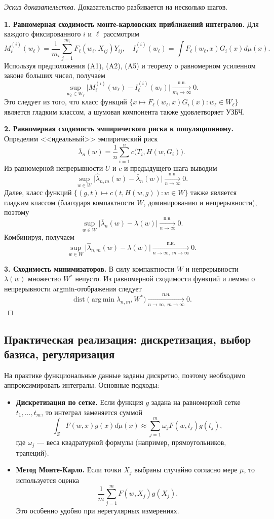 \documentclass[../NDCNNAI_main.tex]{subfiles}
\begin{document}
\begin{proof}[Эскиз доказательства]
Доказательство разбивается на несколько шагов.

\textbf{1. Равномерная сходимость монте-карловских приближений интегралов.}
Для каждого фиксированного $i$ и $\ell$ рассмотрим
\[
M_\ell^{(i)}(w_\ell) = \frac{1}{m_i}\sum_{j=1}^{m_i} F_\ell(w_\ell, X_{ij})Y_{ij}, \quad I_\ell^{(i)}(w_\ell) = \int F_\ell(w_\ell, x)G_i(x)d\mu(x).
\]
Используя предположения (A1), (A2), (A5) и теорему о равномерном усиленном законе больших чисел, получаем
\[
\sup_{w_\ell \in W_\ell} \bigl|M_\ell^{(i)}(w_\ell) - I_\ell^{(i)}(w_\ell)\bigr| \xrightarrow[m_i\to\infty]{\text{п.н.}} 0.
\]
Это следует из того, что класс функций $\{x \mapsto F_\ell(w_\ell, x)G_i(x): w_\ell \in W_\ell\}$ является гладким классом, а шумовая компонента также удовлетворяет УЗБЧ.

\textbf{2. Равномерная сходимость эмпирического риска к популяционному.}
Определим <<идеальный>> эмпирический риск
\[
\bar{\lambda}_n(w) = \frac{1}{n}\sum_{i=1}^n c\bigl(T_i, H(w, G_i)\bigr).
\]
Из равномерной непрерывности $U$ и $c$ и предыдущего шага выводим
\[
\sup_{w\in W} \bigl|\hat{\lambda}_{n,m}(w) - \bar{\lambda}_n(w)\bigr| \xrightarrow[n\to\infty]{\text{п.н.}} 0.
\]
Далее, класс функций $\{(g,t) \mapsto c(t, H(w, g)) : w \in W\}$ также является гладким классом (благодаря компактности $W$, доминированию и непрерывности), поэтому
\[
\sup_{w\in W} \bigl|\bar{\lambda}_n(w) - \lambda(w)\bigr| \xrightarrow[n\to\infty]{\text{п.н.}} 0.
\]
Комбинируя, получаем
\[
\sup_{w\in W} \bigl|\hat{\lambda}_{n,m}(w) - \lambda(w)\bigr| \xrightarrow[n\to\infty,\; m\to\infty]{\text{п.н.}} 0.
\]

\textbf{3. Сходимость минимизаторов.}
В силу компактности $W$ и непрерывности $\lambda(w)$ множество $W^*$ непусто. 
Из равномерной сходимости функций и леммы о непрерывности argmin-отображения следует
\[
\operatorname{dist}\!\bigl(\operatorname{arg\,min} \hat{\lambda}_{n,m}, W^*\bigr) \xrightarrow[n\to\infty,\; m\to\infty]{\text{п.н.}} 0.
\]
\end{proof}

\subsection{Практическая реализация: дискретизация, выбор базиса, регуляризация}
На практике функциональные данные заданы дискретно, поэтому необходимо аппроксимировать интегралы. 
Основные подходы:
\begin{itemize}
    \item \textbf{Дискретизация по сетке.} Если функция $g$ задана на равномерной сетке $t_1,\dots,t_m$, то интеграл заменяется суммой
    \[
    \int_Z F(w, x)g(x)d\mu(x) \approx \sum_{j=1}^m \omega_j F(w, t_j)g(t_j),
    \]
    где $\omega_j$ --- веса квадратурной формулы (например, прямоугольников, трапеций).
    \item \textbf{Метод Монте-Карло.} Если точки $X_j$ выбраны случайно согласно мере $\mu$, то используется оценка
    \[
    \frac{1}{m}\sum_{j=1}^m F(w, X_j)g(X_j).
    \]
    Это особенно удобно при нерегулярных измерениях.
\end{itemize}
\end{document}

